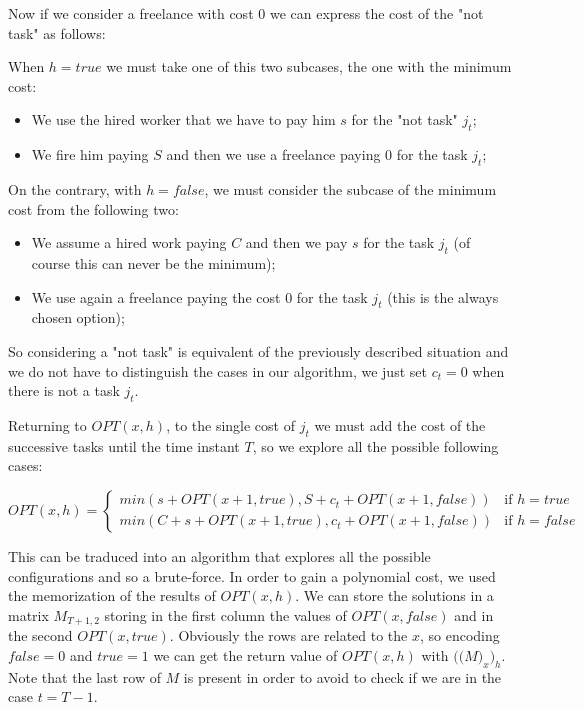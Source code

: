 \documentclass[paper=a4, fontsize=11pt]{scrartcl} %
\numberwithin{equation}{section} %
\numberwithin{figure}{section} %
\numberwithin{table}{section} %
\begin{document}
Now if we consider a freelance with cost $0$ we can express the cost of the "not task" as follows:

When $h = true$ we must take one of this two subcases, the one with the minimum cost:
\begin{itemize}
    \item We use the hired worker that we have to pay him $s$ for the "not task" $j_t$;
    \item We fire him paying $S$ and then we use a freelance paying 0 for the task $j_t$;
\end{itemize}
On the contrary, with $h = false$, we must consider the subcase of the minimum cost from the following two:
\begin{itemize}
    \item We assume a hired work paying $C$ and then we pay $s$ for the task $j_t$ (of course this can never be the minimum);
    \item We use again a freelance paying the cost 0 for the task $j_t$ (this is the always chosen option);
\end{itemize}

So considering a "not task" is equivalent of the previously described situation and we do not have to distinguish the cases in our algorithm, we just set $c_t = 0$ when there is not a task $j_t$.

Returning to $OPT(x, h)$, to the single cost of $j_t$ we must add the cost of the successive tasks until the time instant $T$, so we explore all the possible following cases:

\[
    OPT(x, h) = 
    \begin{cases}
        min(s + OPT(x+1, true), S + c_t + OPT(x+1, false)) & \text{if } h = true \\
        min(C + s + OPT(x+1, true), c_t + OPT(x+1, false)) & \text{if } h = false
    \end{cases}
\]

This can be traduced into an algorithm that explores all the possible configurations and so a brute-force. In order to gain a polynomial cost, we used the memorization of the results of $OPT(x, h)$.
We can store the solutions in a matrix $M_{T+1,2}$ storing in the first column the values of $OPT(x, false)$ and in the second $OPT(x, true)$. Obviously the rows are related to the $x$, so encoding $false = 0$ and $true = 1$ we can get the return value of $OPT(x, h)$ with $\big(\big(M\big)_x\big)_h$. Note that the last row of $M$ is present in order to avoid to check if we are in the case $t = T-1$.
\end{document}
